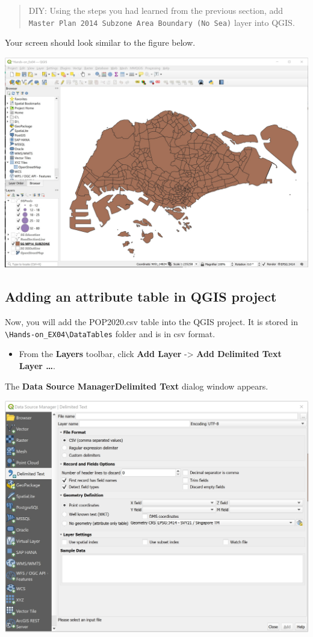 \documentclass[
  letterpaper,
  DIV=11,
  numbers=noendperiod]{scrreprt}
\providecommand{\tightlist}{%
  \setlength{\itemsep}{0pt}\setlength{\parskip}{0pt}}\usepackage{longtable,booktabs,array}
\begin{document}
\begin{quote}
DIY: Using the steps you had learned from the previous section, add
\texttt{Master\ Plan\ 2014\ Subzone\ Area\ Boundary\ (No\ Sea)} layer
into QGIS.
\end{quote}

Your screen should look similar to the figure below.

\includegraphics{./img03/image17.jpg}

\hypertarget{adding-an-attribute-table-in-qgis-project}{%
\subsection{Adding an attribute table in QGIS
project}\label{adding-an-attribute-table-in-qgis-project}}

Now, you will add the POP2020.csv table into the QGIS project. It is
stored in
\texttt{\textbackslash{}Hands-on\_EX04\textbackslash{}DataTables} folder
and is in csv format.

\begin{itemize}
\tightlist
\item
  From the \textbf{Layers} toolbar, click \textbf{Add Layer}
  -\textgreater{} \textbf{Add Delimited Text Layer \ldots{}}.
\end{itemize}

The \textbf{Data Source Manager\textbar Delimited Text} dialog window
appears.

\includegraphics{./img03/image18.jpg}
\end{document}
